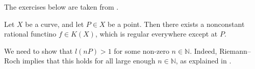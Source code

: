 The exercises below are taken from \cite[Chapter IV]{har77}.

\begin{xca}{1.1}
  Let $X$ be a curve, and let $P \in X$ be a point.
  Then there exists a nonconstant rational functino $f \in K(X)$, which is regular everywhere except at $P$.
  
  \begin{solution}
    We need to show that $l(nP) > 1$ for some non-zero $n \in \mathbb{N}$.
    Indeed, Riemann--Roch implies that this holds for all large enough $n \in \mathbb{N}$, as explained in \cite[Remark 1.3.2]{har77}.
  \end{solution}
\end{xca}

